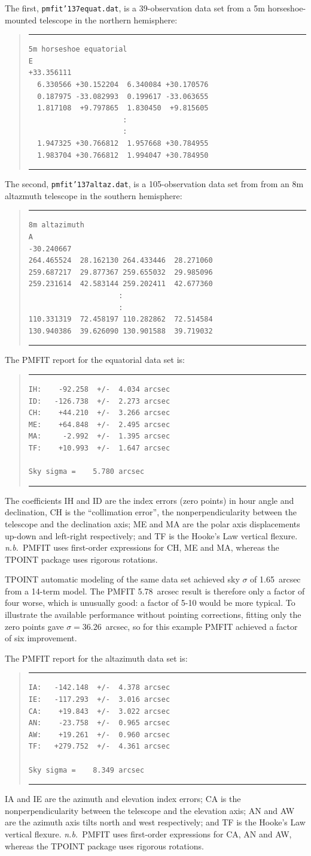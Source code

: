 \documentclass[11pt,fleqn,twoside,\paper]{article}
\renewcommand{\_}{{\tt\char'137}}     %
\newcommand{\scode}     {\goodbreak
                         \begin{quote}
                         \vspace{-6ex}
                         \rule[-2ex]{36em}{0.03ex}}
\newcommand{\ecode}     {\rule[2ex]{36em}{0.03ex}
                         \end{quote}
                         \vspace{-4ex}
                         \goodbreak}
\begin{document}
The first, {\tt pmfit\_equat.dat}, is a 39-observation
data set from a 5m horseshoe-mounted
telescope in the northern hemisphere:
\scode\begin{verbatim}
5m horseshoe equatorial
E
+33.356111
  6.330566 +30.152204  6.340084 +30.170576
  0.187975 -33.082993  0.199617 -33.063655
  1.817108  +9.797865  1.830450  +9.815605
                      :
                      :
  1.947325 +30.766812  1.957668 +30.784955
  1.983704 +30.766812  1.994047 +30.784950
\end{verbatim}\ecode
The second, {\tt pmfit\_altaz.dat}, is a
105-observation data set from from an 8m altazmuth
telescope in the southern hemisphere:
\scode\begin{verbatim}
8m altazimuth
A
-30.240667
264.465524  28.162130 264.433446  28.271060
259.687217  29.877367 259.655032  29.985096
259.231614  42.583144 259.202411  42.677360
                     :
                     :
110.331319  72.458197 110.282862  72.514584
130.940386  39.626090 130.901588  39.719032
\end{verbatim}\ecode
The PMFIT report for the equatorial data set is:
\scode\begin{verbatim}
IH:    -92.258  +/-  4.034 arcsec
ID:   -126.738  +/-  2.273 arcsec
CH:    +44.210  +/-  3.266 arcsec
ME:    +64.848  +/-  2.495 arcsec
MA:     -2.992  +/-  1.395 arcsec
TF:    +10.993  +/-  1.647 arcsec

Sky sigma =    5.780 arcsec
\end{verbatim}\ecode
The coefficients
IH and ID are the index errors (zero points) in
hour angle and declination, CH is the ``collimation error'',
the nonperpendicularity between the telescope and the declination
axis;  ME and MA are the polar axis displacements
up-down and left-right respectively; and TF
is the Hooke's Law vertical flexure.  {\it n.b.}~PMFIT uses first-order
expressions for CH, ME and MA, whereas the TPOINT package uses
rigorous rotations.

TPOINT automatic modeling of the same data set achieved sky
$\sigma$ of 1.65~arcsec from a 14-term
model.  The PMFIT 5.78~arcsec result is therefore only a factor of
four worse, which is unusually good:  a factor of 5-10 would be
more typical.  To illustrate the available performance without
pointing corrections, fitting only the zero points
gave $\sigma = 36.26$~arcsec, so for this example PMFIT
achieved a factor of six improvement.

The PMFIT report for the altazimuth data set is:
\scode\begin{verbatim}
IA:   -142.148  +/-  4.378 arcsec
IE:   -117.293  +/-  3.016 arcsec
CA:    +19.843  +/-  3.022 arcsec
AN:    -23.758  +/-  0.965 arcsec
AW:    +19.261  +/-  0.960 arcsec
TF:   +279.752  +/-  4.361 arcsec

Sky sigma =    8.349 arcsec
\end{verbatim}\ecode
IA and IE are the azimuth and elevation index errors;
CA is the nonperpendicularity between the
telescope and the elevation axis;  AN and AW are the azimuth axis
tilts north and west respectively; and TF
is the Hooke's Law vertical flexure. {\it n.b.}~PMFIT uses first-order
expressions for CA, AN and AW, whereas the TPOINT package uses
rigorous rotations.
\end{document}
